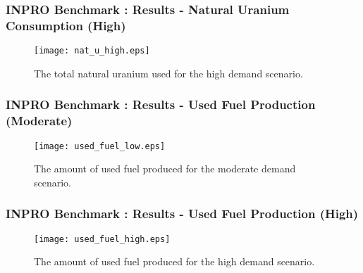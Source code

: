 \begin{frame}
  \frametitle{INPRO Benchmark : Results - Natural Uranium Consumption (High)}  
  \begin{figure}[htbp!]
    \begin{center}
      \texttt{[image: nat\_u\_high.eps]}
      \caption{The total natural uranium used for the high demand scenario.}
      \label{fig:nat_u_high}
    \end{center}  
  \end{figure}
\end{frame}

\begin{frame}
  \frametitle{INPRO Benchmark : Results - Used Fuel Production (Moderate)}  
  \begin{figure}[htbp!]
    \begin{center}
      \texttt{[image: used\_fuel\_low.eps]}
      \caption{The amount of used fuel produced for the moderate demand scenario.}
      \label{fig:used_fuel_low}
    \end{center}  
  \end{figure}
\end{frame}

\begin{frame}
  \frametitle{INPRO Benchmark : Results - Used Fuel Production (High)}  
  \begin{figure}[htbp!]
    \begin{center}
      \texttt{[image: used\_fuel\_high.eps]}
      \caption{The amount of used fuel produced for the high demand scenario.}
      \label{fig:used_fuel_high}
    \end{center}  
  \end{figure}
\end{frame}
